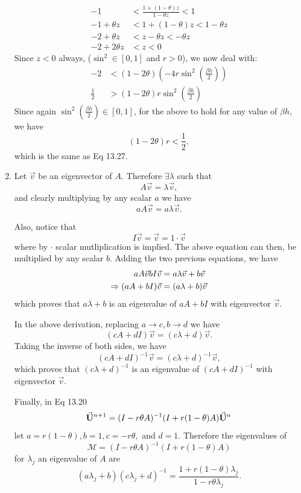 \documentclass[11pt]{article}
\def\f{\frac }
\newcommand{\bvec}[1]{\vec{ {\bf #1 } }}
\begin{document}
\begin{enumerate}
\begin{align*}
-1 & < \f{1+ (1-\theta) z  }{1-\theta z}  < 1 \\
-1+\theta z & < 1+ (1-\theta) z < 1-\theta z \\
-2+\theta z & < z-\theta z < -\theta z \\
-2+2\theta z & < z < 0 \end{align*}
Since $z<0$ always, ($\sin^2 \in [0,1]$ and $r>0$), we now deal with:
\begin{align*} -2& < (1-2\theta) \left ( -4r \sin ^2 \left (\f{\beta h}{2} \right ) \right )\\
\f{1}{2} & > (1-2\theta) r \sin ^2 \left (\f{\beta h}{2} \right )\end{align*}
Since again $\sin ^2 \left (\f{\beta h}{2} \right ) \in [0,1]$, for the above to hold for any value of $\beta h$, we have 
\[  (1-2\theta) r < \f{1}{2}, \]
which is the same as Eq 13.27.


\item Let $\vec{v}$ be an eigenvector of $A$.
Therefore $\exists \lambda $ such that
\[A\vec{v} = \lambda \vec{v},\]
and clearly multiplying by any scalar $a$ we have
\[aA\vec{v} = a\lambda \vec{v}.\]

Also, notice that 
\[ I\vec{v} = \vec{v} = 1\cdot \vec{v} \]
where by $\cdot$ scalar mutliplication is implied.
The above equation can then, be multiplied by any scalar $b$.
Adding the two previous equations, we have
\begin{align*} aA\vec{v} bI\vec{v}  &= a\lambda \vec{v} + b\vec{v}\\ \vspace{1mm}
\Rightarrow (aA+ bI)\vec{v}  &= (a\lambda +b) \vec{v}\end{align*}
which proves that $a\lambda +b$ is an eigenvalue of $aA+ bI$ with eigenvector $\vec{v}$.

In the above derivation, replacing $a \to c, b \to d$ we have
\[ (cA+ dI)\vec{v} = (c\lambda +d) \vec{v}.\]
Taking the inverse of both sides, we have
\[ (cA+ dI)^{-1}\vec{v} = (c\lambda +d)^{-1} \vec{v},\]
which proves that $(c\lambda +d)^{-1}$ is an eigenvalue of $(cA+ dI)^{-1}$ with eigenvector $\vec{v}$.

Finally, in Eq 13.20
\[ \bvec{U} ^{n+1}  = (I - r \theta A ) ^{-1} (I + r(1-\theta ) A) \bvec{U} ^n \]
let $a = r(1-\theta) , b = 1, c = -r\theta, $  and $d=1$.
Therefore the eigenvalues of 
\[ \mathcal{M} =  (I - r \theta A ) ^{-1} (I + r(1-\theta ) A) \]
for $\lambda _j$ an eigenvalue of $A$ are
\[ (a \lambda _j + b) (c\lambda _j + d) ^{-1}  = \f{1 + r(1-\theta) \lambda _j }{1 - r\theta \lambda _j}. \]


\end{enumerate}
\end{document}

